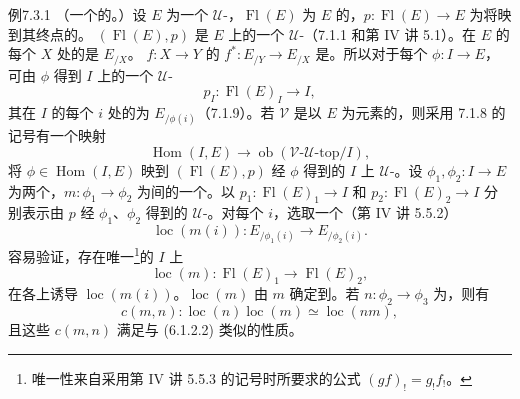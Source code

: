 \begin{SGAresult}{例}{7.3.1}
（一个的。）设 $E$ 为一个 $\mathcal U$-，$\operatorname{Fl}(E)$ 为 $E$ 的，$p:\operatorname{Fl}(E)\to E$ 为将映到其终点的。 $(\operatorname{Fl}(E),p)$ 是 $E$ 上的一个 $\mathcal U$-（7.1.1 和第 IV 讲 5.1）。在 $E$ 的每个 $X$ 处的是 $E_{/X}$。 $f:X\to Y$ 的 $f^*:E_{/Y}\to E_{/X}$ 是。所以对于每个 $\phi:I\to E$，可由 $\phi$ 得到 $I$ 上的一个 $\mathcal U$-
\[p_I:\operatorname{Fl}(E)_I\longrightarrow I,\tag{7.3.1.1}\]
其在 $I$ 的每个 $i$ 处的为 $E_{/\phi(i)}$（7.1.9）。若 $\mathcal V$ 是以 $E$ 为元素的，则采用 7.1.8 的记号有一个映射
\[\operatorname{Hom}(I,E)\longrightarrow\operatorname{ob}(\mathcal V\text{-}\mathcal U\text{-}\mathrm{top}/I),\tag{7.3.1.2}\]
将 $\phi\in\operatorname{Hom}(I,E)$ 映到 $(\operatorname{Fl}(E),p)$ 经 $\phi$ 得到的 $I$ 上 $\mathcal U$-。设 $\phi_1,\phi_2:I\to E$ 为两个，$m:\phi_1\to\phi_2$ 为间的一个。以 $p_1:\operatorname{Fl}(E)_1\to I$ 和 $p_2:\operatorname{Fl}(E)_2\to I$ 分别表示由 $p$ 经 $\phi_1$、$\phi_2$ 得到的 $\mathcal U$-。对每个 $i$，选取一个（第 IV 讲 5.5.2）
\[\operatorname{loc}(m(i)):E_{/\phi_1(i)}\longrightarrow E_{/\phi_2(i)}.\tag{7.3.1.3}\]
容易验证，存在唯一\footnote{唯一性来自采用第 IV 讲 5.5.3 的记号时所要求的公式 $(gf)_!=g_!f_!$。}的 $I$ 上
\[\operatorname{loc}(m):\operatorname{Fl}(E)_1\longrightarrow\operatorname{Fl}(E)_2,\tag{7.3.1.4}\]
在各上诱导 $\operatorname{loc}(m(i))$。$\operatorname{loc}(m)$ 由 $m$ 确定到。若 $n:\phi_2\to\phi_3$ 为，则有
\[c(m,n):\operatorname{loc}(n)\operatorname{loc}(m)\simeq\operatorname{loc}(nm),\tag{7.3.1.5}\]
且这些 $c(m,n)$ 满足与 (6.1.2.2) 类似的性质。
\end{SGAresult}
